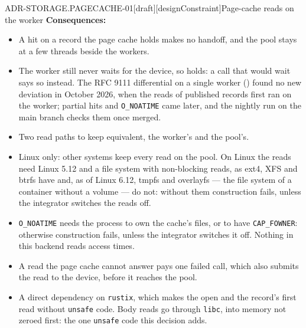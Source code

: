 \begin{requirement}{ADR-STORAGE.PAGECACHE-01}[draft][designConstraint]{Page-cache reads on the worker}
  \textbf{Consequences:}
  \begin{itemize}
    \item[+] A hit on a record the page cache holds makes no handoff, and the
      pool stays at a few threads beside the workers.
    \item[+] The worker still never waits for the device, so
       holds: a call that would wait says so
      instead. The RFC 9111 differential on a single worker
      () found no new deviation in October 2026,
      when the reads of published records first ran on the worker; partial
      hits and \texttt{O\_NOATIME} came later, and the nightly run on the
      main branch checks them once merged.
    \item[--] Two read paths to keep equivalent, the worker's and the pool's.
    \item[--] Linux only: other systems keep every read on the pool. On
      Linux the reads need Linux 5.12 and a file system with non-blocking
      reads, as ext4, XFS and btrfs have and, as of Linux 6.12, tmpfs and
      overlayfs --- the file system of a container without a volume --- do
      not: without them construction fails, unless the integrator switches
      the reads off.
    \item[--] \texttt{O\_NOATIME} needs the process to own the cache's files,
      or to have \texttt{CAP\_FOWNER}: otherwise construction fails, unless
      the integrator switches it off. Nothing in this backend reads access
      times.
    \item[--] A read the page cache cannot answer pays one failed call, which
      also submits the read to the device, before it reaches the pool.
    \item[--] A direct dependency on \texttt{rustix}, which makes the open
      and the record's first read without \texttt{unsafe} code. Body reads
      go through \texttt{libc}, into memory not zeroed first: the one
      \texttt{unsafe} code this decision adds.
  \end{itemize}



\end{requirement}

